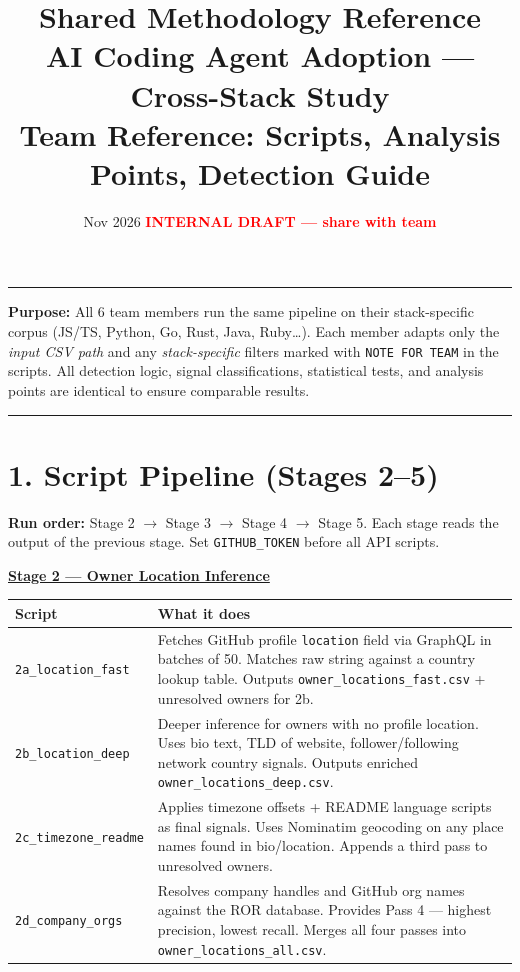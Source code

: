 \documentclass[9pt,a4paper]{article}
\title{\vspace{-1cm}\textbf{Shared Methodology Reference}\\[2pt]
{\large AI Coding Agent Adoption --- Cross-Stack Study}\\[1pt]
{\normalsize Team Reference: Scripts, Analysis Points, Detection Guide}}
\date{\small Nov 2026 \quad \textcolor{red}{\textbf{INTERNAL DRAFT --- share with team}}}
\author{}
\begin{document}
\maketitle
\vspace{-10pt}
\hrule
\vspace{4pt}

{\footnotesize
\textbf{Purpose:} All 6 team members run the same pipeline on their stack-specific corpus
(JS/TS, Python, Go, Rust, Java, Ruby\ldots). Each member adapts only the \emph{input CSV path}
and any \emph{stack-specific} filters marked with \texttt{NOTE FOR TEAM} in the scripts.
All detection logic, signal classifications, statistical tests, and analysis points are
identical to ensure comparable results.}

\vspace{4pt}
\hrule
\vspace{4pt}

\footnotesize

\section*{\textcolor{stageblue}{1. Script Pipeline (Stages 2--5)}}

\noindent\textbf{Run order:} Stage 2 $\to$ Stage 3 $\to$ Stage 4 $\to$ Stage 5. Each stage reads
the output of the previous stage. Set \texttt{GITHUB\_TOKEN} before all API scripts.

\vspace{4pt}
\noindent\textbf{\underline{Stage 2 --- Owner Location Inference}}

\begin{tabular}{@{}lp{14cm}@{}}
\toprule
Script & What it does \\
\midrule
\cellcolor{stagegray}\texttt{2a\_location\_fast} &
  Fetches GitHub profile \texttt{location} field via GraphQL in batches of 50.
  Matches raw string against a country lookup table.
  Outputs \texttt{owner\_locations\_fast.csv} + unresolved owners for 2b. \\[2pt]
\cellcolor{stagegray}\texttt{2b\_location\_deep} &
  Deeper inference for owners with no profile location.
  Uses bio text, TLD of website, follower/following network country signals.
  Outputs enriched \texttt{owner\_locations\_deep.csv}. \\[2pt]
\cellcolor{stagegray}\texttt{2c\_timezone\_readme} &
  Applies timezone offsets + README language scripts as final signals.
  Uses Nominatim geocoding on any place names found in bio/location.
  Appends a third pass to unresolved owners. \\[2pt]
\cellcolor{stagegray}\texttt{2d\_company\_orgs} &
  Resolves company handles and GitHub org names against the ROR database.
  Provides Pass 4 --- highest precision, lowest recall.
  Merges all four passes into \texttt{owner\_locations\_all.csv}. \\
\bottomrule
\end{tabular}
\end{document}
